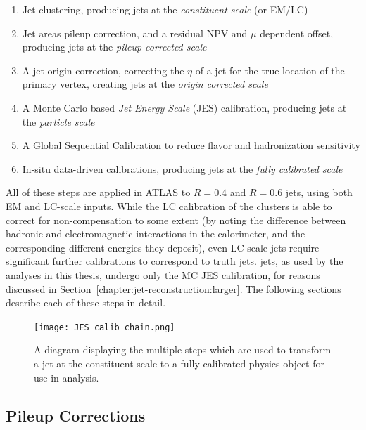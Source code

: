 \begin{enumerate}
	\item Jet clustering, producing jets at the \textit{constituent scale} (or EM/LC)
	\item Jet areas pileup correction, and a residual NPV and $\mu$ dependent offset, producing jets at the \textit{pileup corrected scale}
	\item A jet origin correction, correcting the $\eta$ of a jet for the true location of the primary vertex, creating jets at the \textit{origin corrected scale}
	\item A Monte Carlo based \textit{Jet Energy Scale} (JES) calibration, producing jets at the \textit{particle scale}
	\item A Global Sequential Calibration to reduce flavor and hadronization sensitivity
	\item In-situ data-driven calibrations, producing jets at the \textit{fully calibrated scale}
\end{enumerate}

All of these steps are applied in ATLAS to $R=0.4$ and $R=0.6$ jets, using both EM and LC-scale inputs. While the LC calibration of the clusters is able to correct for non-compensation to some extent (by noting the difference between hadronic and electromagnetic interactions in the calorimeter, and the corresponding different energies they deposit), even LC-scale jets require significant further calibrations to correspond to truth jets. \LargeR jets, as used by the analyses in this thesis, undergo only the MC JES calibration, for reasons discussed in Section~\ref{chapter:jet-reconstruction:larger}. The following sections describe each of these steps in detail.


\begin{figure}
\centering
\texttt{[image: JES\_calib\_chain.png]}
\label{fig:jet-reconstruction:making-jets}
\caption{A diagram displaying the multiple steps which are used to transform a jet at the constituent scale to a fully-calibrated physics object for use in analysis.}
\end{figure}


\subsection{Pileup Corrections}
\label{chapter:jet-reconstruction:pileup-corrections}

